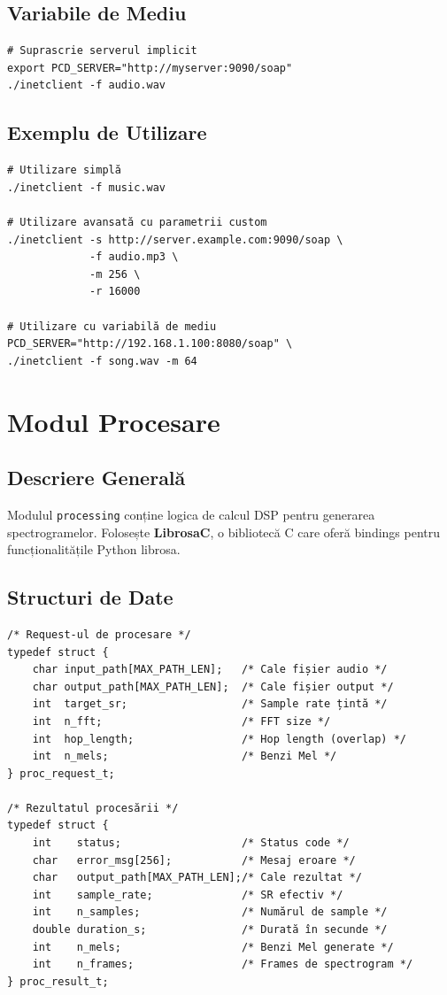 \documentclass[12pt,a4paper,oneside]{book}
\begin{document}
\subsection{Variabile de Mediu}

\begin{lstlisting}
# Suprascrie serverul implicit
export PCD_SERVER="http://myserver:9090/soap"
./inetclient -f audio.wav
\end{lstlisting}

\subsection{Exemplu de Utilizare}

\begin{lstlisting}
# Utilizare simplă
./inetclient -f music.wav

# Utilizare avansată cu parametrii custom
./inetclient -s http://server.example.com:9090/soap \
             -f audio.mp3 \
             -m 256 \
             -r 16000

# Utilizare cu variabilă de mediu
PCD_SERVER="http://192.168.1.100:8080/soap" \
./inetclient -f song.wav -m 64
\end{lstlisting}

\section{Modul Procesare}

\subsection{Descriere Generală}

Modulul \texttt{processing} conține logica de calcul DSP pentru generarea spectrogramelor. Folosește \textbf{LibrosaC}, o bibliotecă C care oferă bindings pentru funcționalitățile Python librosa.

\subsection{Structuri de Date}

\begin{lstlisting}
/* Request-ul de procesare */
typedef struct {
    char input_path[MAX_PATH_LEN];   /* Cale fișier audio */
    char output_path[MAX_PATH_LEN];  /* Cale fișier output */
    int  target_sr;                  /* Sample rate țintă */
    int  n_fft;                      /* FFT size */
    int  hop_length;                 /* Hop length (overlap) */
    int  n_mels;                     /* Benzi Mel */
} proc_request_t;

/* Rezultatul procesării */
typedef struct {
    int    status;                   /* Status code */
    char   error_msg[256];           /* Mesaj eroare */
    char   output_path[MAX_PATH_LEN];/* Cale rezultat */
    int    sample_rate;              /* SR efectiv */
    int    n_samples;                /* Numărul de sample */
    double duration_s;               /* Durată în secunde */
    int    n_mels;                   /* Benzi Mel generate */
    int    n_frames;                 /* Frames de spectrogram */
} proc_result_t;
\end{lstlisting}
\end{document}
